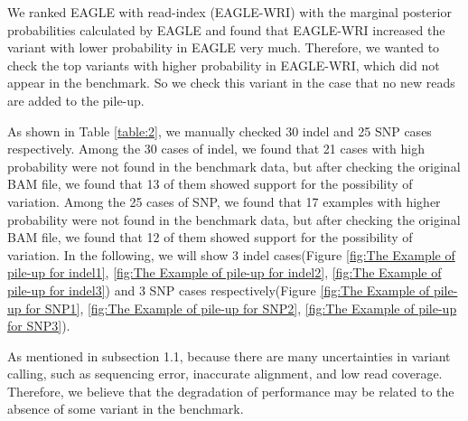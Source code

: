 \documentclass[PhD]{PHlab-thesis}
\begin{document}
We ranked EAGLE with read-index (EAGLE-WRI) with the marginal posterior probabilities calculated by EAGLE and found that EAGLE-WRI increased the variant with lower probability in EAGLE very much. Therefore, we wanted to check the top variants with higher probability in EAGLE-WRI, which did not appear in the benchmark. So we check this variant in the case that no new reads are added to the pile-up.

As shown in Table \ref{table:2}, we manually checked 30 indel and 25 SNP cases respectively. Among the 30 cases of indel, we found that 21 cases with high probability were not found in the benchmark data, but after checking the original BAM file, we found that 13 of them showed support for the possibility of variation. Among the 25 cases of SNP, we found that 17 examples with higher probability were not found in the benchmark data, but after checking the original BAM file, we found that 12 of them showed support for the possibility of variation. In the following, we will show 3 indel cases(Figure \ref{fig:The Example of pile-up for indel1}, \ref{fig:The Example of pile-up for indel2}, \ref{fig:The Example of pile-up for indel3}) and 3 SNP cases respectively(Figure \ref{fig:The Example of pile-up for SNP1}, \ref{fig:The Example of pile-up for SNP2}, \ref{fig:The Example of pile-up for SNP3}).

As mentioned in subsection 1.1, because there are many uncertainties in variant calling, such as sequencing error, inaccurate alignment, and low read coverage. Therefore, we believe that the degradation of performance may be related to the absence of some variant in the benchmark.

\begin{table}[h!]
	\centering
	\caption{Checking the pile-up for mutations}
	\label{table:2}
\end{table}
\end{document}
